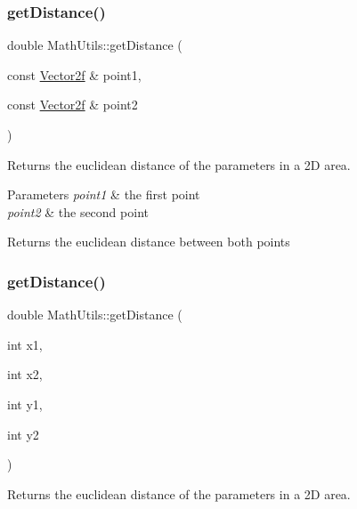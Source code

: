 \subsubsection{\texorpdfstring{getDistance()}{getDistance()}\hspace{0.1cm}{\footnotesize\ttfamily [2/4]}}
{\footnotesize\ttfamily double Math\+Utils\+::get\+Distance (\begin{DoxyParamCaption}\item[{const \mbox{\hyperlink{struct_vector2f}{Vector2f}} \&}]{point1,  }\item[{const \mbox{\hyperlink{struct_vector2f}{Vector2f}} \&}]{point2 }\end{DoxyParamCaption})\hspace{0.3cm}{\ttfamily [static]}}



Returns the euclidean distance of the parameters in a 2D area. 


\begin{DoxyParams}{Parameters}
{\em point1} & the first point \\
\hline
{\em point2} & the second point \\
\hline
\end{DoxyParams}
\begin{DoxyReturn}{Returns}
the euclidean distance between both points 
\end{DoxyReturn}
\mbox{\label{class_math_utils_aae2742c9ac7c8d9165bddd12f6c48c54}} 
\subsubsection{\texorpdfstring{getDistance()}{getDistance()}\hspace{0.1cm}{\footnotesize\ttfamily [3/4]}}
{\footnotesize\ttfamily double Math\+Utils\+::get\+Distance (\begin{DoxyParamCaption}\item[{int}]{x1,  }\item[{int}]{x2,  }\item[{int}]{y1,  }\item[{int}]{y2 }\end{DoxyParamCaption})\hspace{0.3cm}{\ttfamily [static]}}



Returns the euclidean distance of the parameters in a 2D area. 


